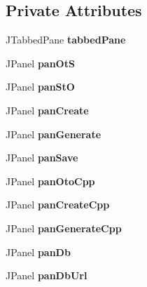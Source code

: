 \subsection*{Private Attributes}
\begin{DoxyCompactItemize}
\item 
\hypertarget{class_gui_a5d01eb139be015afd0cbfebdcb70bbf8}{
JTabbedPane {\bfseries tabbedPane}}
\label{class_gui_a5d01eb139be015afd0cbfebdcb70bbf8}

\item 
\hypertarget{class_gui_a36c033940690e4ae28871628ada56d72}{
JPanel {\bfseries panOtS}}
\label{class_gui_a36c033940690e4ae28871628ada56d72}

\item 
\hypertarget{class_gui_aa4a86659f9bd5c48fe76c06fe9d39fab}{
JPanel {\bfseries panStO}}
\label{class_gui_aa4a86659f9bd5c48fe76c06fe9d39fab}

\item 
\hypertarget{class_gui_a175eba9ba66e729568f24c0d053d5dc4}{
JPanel {\bfseries panCreate}}
\label{class_gui_a175eba9ba66e729568f24c0d053d5dc4}

\item 
\hypertarget{class_gui_a2536df4705c8c7847d7088c237297f93}{
JPanel {\bfseries panGenerate}}
\label{class_gui_a2536df4705c8c7847d7088c237297f93}

\item 
\hypertarget{class_gui_a0fdad8d45d7c1fc06f45cf8eabb58ec1}{
JPanel {\bfseries panSave}}
\label{class_gui_a0fdad8d45d7c1fc06f45cf8eabb58ec1}

\item 
\hypertarget{class_gui_a8f24ef032ffeca732e7490a7e6d8a517}{
JPanel {\bfseries panOtoCpp}}
\label{class_gui_a8f24ef032ffeca732e7490a7e6d8a517}

\item 
\hypertarget{class_gui_a4200668179c8238d5650f7185448ebaf}{
JPanel {\bfseries panCreateCpp}}
\label{class_gui_a4200668179c8238d5650f7185448ebaf}

\item 
\hypertarget{class_gui_a9a8c533bacd240721d0141c379970456}{
JPanel {\bfseries panGenerateCpp}}
\label{class_gui_a9a8c533bacd240721d0141c379970456}

\item 
\hypertarget{class_gui_a2d64f1be585e1c2dd56a2df9b38860da}{
JPanel {\bfseries panDb}}
\label{class_gui_a2d64f1be585e1c2dd56a2df9b38860da}

\item 
\hypertarget{class_gui_a3b8a05de00dd5f06b13c1b32e6cdae38}{
JPanel {\bfseries panDbUrl}}
\label{class_gui_a3b8a05de00dd5f06b13c1b32e6cdae38}


\end{DoxyCompactItemize}

